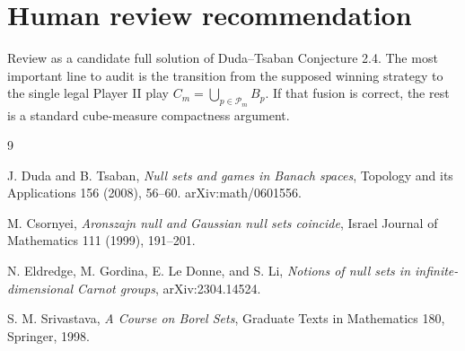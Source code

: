 \documentclass[11pt]{amsart}
\newcommand{\Pcal}{\mathcal P}
\begin{document}
\section*{Human review recommendation}

Review as a candidate full solution of Duda--Tsaban Conjecture 2.4.  The most
important line to audit is the transition from the supposed winning strategy to
the single legal Player II play \(C_m=\bigcup_{p\in\Pcal_m}B_p\).  If that
fusion is correct, the rest is a standard cube-measure compactness argument.

\begin{thebibliography}{9}

J. Duda and B. Tsaban,
\emph{Null sets and games in Banach spaces},
Topology and its Applications 156 (2008), 56--60.
arXiv:math/0601556.

M. Csornyei,
\emph{Aronszajn null and Gaussian null sets coincide},
Israel Journal of Mathematics 111 (1999), 191--201.

N. Eldredge, M. Gordina, E. Le Donne, and S. Li,
\emph{Notions of null sets in infinite-dimensional Carnot groups},
arXiv:2304.14524.

S. M. Srivastava,
\emph{A Course on Borel Sets},
Graduate Texts in Mathematics 180, Springer, 1998.

\end{thebibliography}
\end{document}
